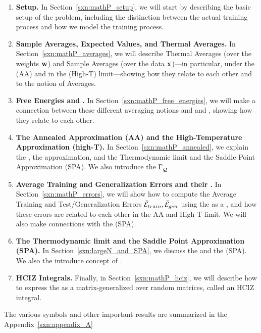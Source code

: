 \begin{enumerate}[label=4.2.\arabic*]
\item
  \textbf{Setup.}
  In Section~\ref{sxn:mathP_setup}, 
we will start by describing the basic setup of the problem, including the distinction between the actual training process and how we model the training process.

 \item
  \textbf{Sample Averages, Expected Values, and Thermal Averages.}
In Section~\ref{sxn:mathP_averages}, 
we will describe Thermal Averages (over the weights ${\mathbf{w}}$) and Sample Averages (over the data ${\mathbf{x}}$)---in particular, under the \AnnealedApproximation (AA) and in the \HighTemperature (High-T) limit---showing how they relate to each other and to the notion of \Replica Averages.
%
\item
  \textbf{Free Energies and \GeneratingFunctions.} 
In Section~\ref{sxn:mathP_free_energies}, 
we will make a connection between these different averaging notions and \FreeEnergies and \GeneratingFunctions, showing how they relate to each other.
%

\item
  \textbf{The Annealed Approximation (AA) and the High-Temperature Approximation (high-T).}
  In Section~\ref{sxn:mathP_annealed}, we explain the \AnnealedApproximation, the \HighTemperature approximation,
  and the Thermodynamic \LargeN limit and the Saddle Point Approximation (SPA).
  We also introduce the \Quality \GeneratingFunction $\Gamma_{\bar{\mathcal{Q}}}$
%
  \item
    \textbf{Average Training and Generalization Errors and their \GeneratingFunctions.}
  In Section~\ref{sxn:mathP_errors}, we will show how to compute the Average Training and Test/Generalization Errors $\bar{\mathcal{E}}_{train}, \bar{\mathcal{E}}_{gen}$
using the \FreeEnergy as a \GeneratingFunction, and how these errors are related to each other in the AA and High-T limit. 
We will also make connections with the \SaddlePointApproximation (SPA).
%
\item 
  \textbf{The Thermodynamic \LargeN limit and the Saddle Point Approximation (SPA).}
  In Section~\ref{sxn:largeN_and_SPA}, we discuss the \LargeN \ThermodynamicLimit and the \SaddlePointApproximation (SPA).
  We also the introduce concept of \SelfAveraging.
%
 \item
  \textbf{HCIZ Integrals.}
Finally, in Section~\ref{sxn:mathP_hciz}, we will describe how to express the \FreeEnergy as a matrix-generalized \ThermalAverage over random matrices, called an HCIZ integral.
\end{enumerate}
The various symbols and other important results are summarized in the Appendix~\ref{sxn:appendix_A}


